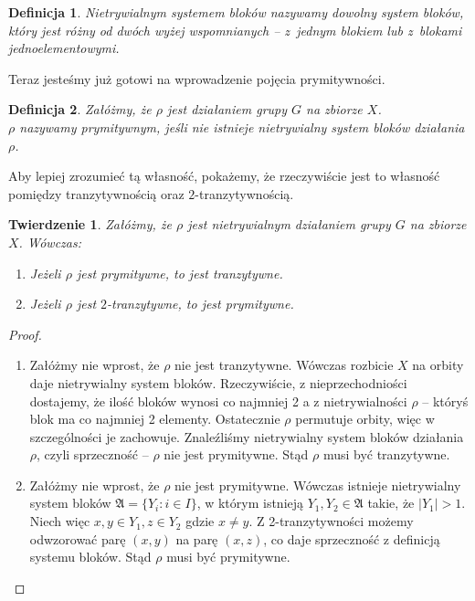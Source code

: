 \documentclass[licencjacka]{pracamgr}
\newtheorem{deff}{Definicja}[section]
\newtheorem{thh}{Twierdzenie}[section]
\begin{document}
\begin{deff}
	\emph{Nietrywialnym systemem bloków} nazywamy dowolny system bloków, 
	który jest różny od dwóch wyżej wspomnianych -- z~jednym blokiem lub z~blokami jednoelementowymi.
\end{deff}

Teraz jesteśmy już gotowi na wprowadzenie pojęcia prymitywności.

\begin{deff}
	Załóżmy, że $\rho$ jest działaniem grupy $G$ na zbiorze $X$. \\
	\emph{$\rho$ nazywamy prymitywnym}, jeśli nie istnieje nietrywialny system bloków działania $\rho$.
\end{deff}

Aby lepiej zrozumieć tą własność, pokażemy, że rzeczywiście jest to własność pomiędzy tranzytywnością oraz $2$-tranzytywnością.

\begin{thh}
	Załóżmy, że $\rho$ jest nietrywialnym działaniem grupy $G$ na zbiorze $X$. Wówczas:
	\begin{enumerate}[label=\alph*)]
	 \item Jeżeli $\rho$ jest prymitywne, to jest tranzytywne.
	 \item Jeżeli $\rho$ jest $2$-tranzytywne, to jest prymitywne.
	\end{enumerate}
\end{thh}

\begin{proof}
$ $\\
	\begin{enumerate}[label=Ad \alph*)] 
	 \item 	Załóżmy nie wprost, że $\rho$ nie jest tranzytywne. 
					Wówczas rozbicie $X$ na orbity daje nietrywialny system bloków.
					Rzeczywiście, z nieprzechodniości dostajemy, że ilość bloków wynosi co najmniej 2 a
					z nietrywialności $\rho$ -- któryś blok ma co najmniej 2 elementy.
					Ostatecznie $\rho$ permutuje orbity, więc w szczególności je zachowuje.
					Znaleźliśmy nietrywialny system bloków działania $\rho$, czyli sprzeczność -- $\rho$ nie jest prymitywne.
					Stąd $\rho$ musi być tranzytywne.
	 \item 	Załóżmy nie wprost, że $\rho$ nie jest prymitywne.
					Wówczas istnieje nietrywialny system bloków $\mathfrak{A} = \{Y_i \colon i \in I \}$, 
					w którym istnieją $Y_1, Y_2 \in \mathfrak{A}$ takie, że $|Y_1| > 1$.
					Niech więc $x,y \in Y_1, z \in Y_2$ gdzie $x \ne y$.
					Z 2-tranzytywności możemy odwzorować parę $(x, y)$ na parę $(x, z)$, co daje sprzeczność z definicją systemu bloków.
					Stąd $\rho$ musi być prymitywne.
	\end{enumerate}
\end{proof}
\end{document}
